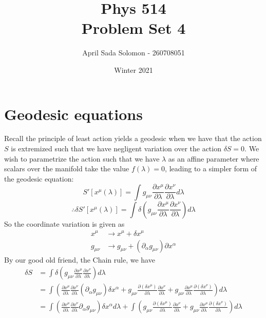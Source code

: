 \documentclass{article}
\title{Phys 514 \\
	\large Problem Set 4}
\author{April Sada Solomon - 260708051}
\date{Winter 2021}
\begin{document}
	\maketitle
	\thispagestyle{empty}
	\pagebreak
	
	\cfoot{\thepage}
	
	\tableofcontents
	\newpage
	
	
	\setcounter{page}{1}
	\cfoot{\thepage}

	\section{Geodesic equations}
	
	Recall the principle of least action yields a geodesic when we have that the action $S$ is extremized such that we have negligent variation over the action $\delta S =0$. We wish to parametrize the action such that we have $\lambda$ as an affine parameter where scalars over the manifold take the value $f(\lambda) = 0$, leading to a simpler form of the geodesic equation:
	\vspace{-0cm}
	$$ S' [x^\mu (\lambda)] = \int g_{\mu \nu} \frac{\partial x^\mu}{\partial \lambda} \frac{\partial x^\nu}{\partial \lambda} d \lambda$$
	$$ \therefore \delta  S' \left[ x^\mu (\lambda)\right] = \int \delta \left(  g_{\mu \nu} \frac{\partial x^\mu}{\partial \lambda} \frac{\partial x^\nu}{\partial \lambda} \right) d \lambda$$
	So the coordinate variation is given as
	\begin{align*}
		x^\mu &\to x^\mu + \delta x^\mu \\
		g_{\mu\nu} &\to g_{\mu\nu} + \left( \partial_\alpha g_{\mu \nu} \right) \partial x^\alpha
	\end{align*}
	By our good old friend, the Chain rule, we have
	\begin{align*}
		\delta S &= \int \delta \left(  g_{\mu \nu} \frac{\partial x^\mu}{\partial \lambda} \frac{\partial x^\nu}{\partial \lambda} \right) d \lambda    \\
		&= \int 
			\left( 
				\frac{\partial x^\mu}{\partial \lambda} \frac{\partial x^\nu}{\partial \lambda} 
				\left( 
					\partial_\alpha g_{\mu\nu} 
				\right)
				\delta x^\alpha 
				+
				g_{\mu\nu} 	\frac{\partial (\delta x^\mu)}{\partial \lambda} \frac{\partial x^\nu}{\partial \lambda}
				+
				g_{\mu\nu} 	\frac{\partial x^\mu}{\partial \lambda} \frac{\partial (\delta x^\nu)}{\partial \lambda}  
			\right) d \lambda \\
		&= \int \left( 
			\frac{\partial x^\mu}{\partial \lambda} \frac{\partial x^\nu}{\partial \lambda} 
			\partial_\alpha g_{\mu\nu} 
			\right)
			\delta x^\alpha  d \lambda	
			+
			\int
			\left(
			g_{\mu\nu} 	\frac{\partial (\delta x^\mu)}{\partial \lambda} \frac{\partial x^\nu}{\partial \lambda}
			+
			g_{\mu\nu} 	\frac{\partial x^\mu}{\partial \lambda} \frac{\partial (\delta x^\nu)}{\partial \lambda}  
			\right) d \lambda	
	\end{align*}
\end{document}
